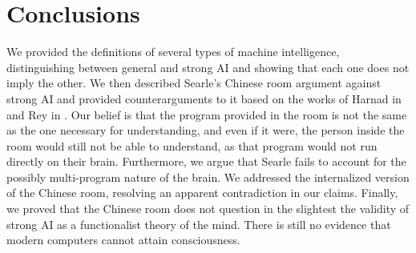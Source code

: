 \section{Conclusions}

We provided the definitions of several types of machine intelligence, distinguishing between general and strong AI and showing that each one does not imply the other. We then described Searle's Chinese room argument against strong AI and provided counterarguments to it based on the works of Harnad in \cite{harnad1989minds} and Rey in \cite{rey1986s}. Our belief is that the program provided in the room is not the same as the one necessary for understanding, and even if it were, the person inside the room would still not be able to understand, as that program would not run directly on their brain. Furthermore, we argue that Searle fails to account for the possibly multi-program nature of the brain. We addressed the internalized version of the Chinese room, resolving an apparent contradiction in our claims. Finally, we proved that the Chinese room does not question in the slightest the validity of strong AI as a functionalist theory of the mind. There is still no evidence that modern computers cannot attain consciousness.
